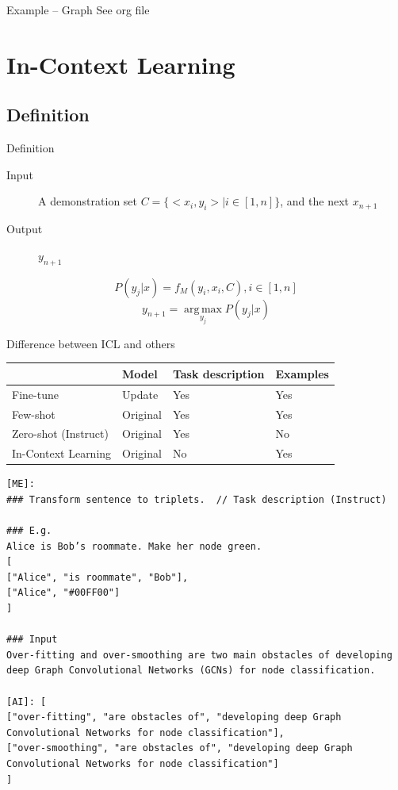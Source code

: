 \documentclass[aspectratio=1610,xcolor={dvipsnames},hyperref={colorlinks,unicode,linkcolor=violet,anchorcolor=BlueViolet,citecolor=YellowOrange,filecolor=black,urlcolor=Aquamarine}]{beamer}
\begin{document}
\begin{frame}[label={sec:org43ea0fe}]{Example -- Graph}
See org file
\end{frame}

\section{In-Context Learning}
\label{sec:orga016819}

\subsection{Definition}
\label{sec:orgd9c8903}

\begin{frame}[label={sec:org56d5c7d}]{Definition}
\begin{description}
\item[{Input}] A demonstration set \(C = \{<x_{i}, y_{i}> | i \in [1, n]\}\), and the next \(x_{n+1}\)
\item[{Output}] \(y_{n+1}\)
\end{description}

\[P( y_{j} | x ) = f_{M}(y_{i}, x_{i}, C), i \in [1, n] \]
\[ y_{n + 1} = \operatorname*{arg\,max}_{y_{j}} P(y_{j}|x) \]
\end{frame}

\begin{frame}[label={sec:org0e6c92b},fragile]{Difference between ICL and others}
 \begin{center}
\begin{tabular}{llll}
\toprule
 & Model & Task description & Examples\\[0pt]
\midrule
Fine-tune & Update & Yes & Yes\\[0pt]
Few-shot & Original & Yes & Yes\\[0pt]
Zero-shot (Instruct) & Original & Yes & No\\[0pt]
In-Context Learning & Original & No & Yes\\[0pt]
\bottomrule
\end{tabular}
\end{center}

{\tiny

\begin{verbatim}
[ME]:
### Transform sentence to triplets.  // Task description (Instruct)

### E.g.
Alice is Bob’s roommate. Make her node green.
[
["Alice", "is roommate", "Bob"],
["Alice", "#00FF00"]
]

### Input
Over-fitting and over-smoothing are two main obstacles of developing deep Graph Convolutional Networks (GCNs) for node classification.

[AI]: [
["over-fitting", "are obstacles of", "developing deep Graph Convolutional Networks for node classification"],
["over-smoothing", "are obstacles of", "developing deep Graph Convolutional Networks for node classification"]
]
\end{verbatim}

}
\end{frame}
\end{document}
